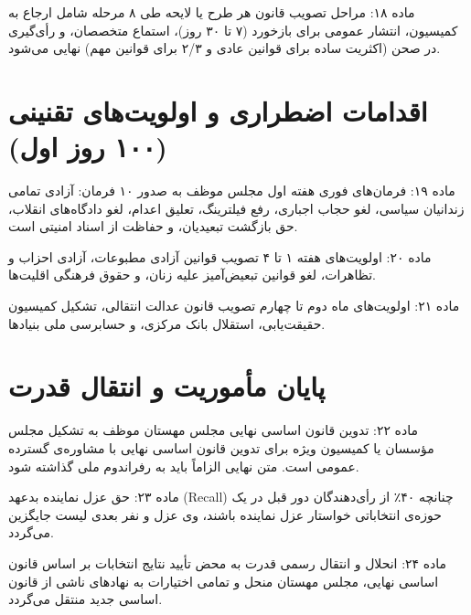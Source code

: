 \documentclass[12pt,a4paper,oneside]{report}
\begin{document}
\begin{articlebox}{ماده ۱۸: مراحل تصویب قانون}
هر طرح یا لایحه طی ۸ مرحله شامل ارجاع به کمیسیون، انتشار عمومی برای بازخورد (۷ تا ۳۰ روز)، استماع متخصصان، و رأی‌گیری در صحن (اکثریت ساده برای قوانین عادی و ۲/۳ برای قوانین مهم) نهایی می‌شود.
\end{articlebox}

\chapter{اقدامات اضطراری و اولویت‌های تقنینی (۱۰۰ روز اول)}

\begin{articlebox}{ماده ۱۹: فرمان‌های فوری هفته اول}
مجلس موظف به صدور ۱۰ فرمان: آزادی تمامی زندانیان سیاسی، لغو حجاب اجباری، رفع فیلترینگ، تعلیق اعدام، لغو دادگاه‌های انقلاب، حق بازگشت تبعیدیان، و حفاظت از اسناد امنیتی است.
\end{articlebox}

\begin{articlebox}{ماده ۲۰: اولویت‌های هفته ۱ تا ۴}
تصویب قوانین آزادی مطبوعات، آزادی احزاب و تظاهرات، لغو قوانین تبعیض‌آمیز علیه زنان، و حقوق فرهنگی اقلیت‌ها.
\end{articlebox}

\begin{articlebox}{ماده ۲۱: اولویت‌های ماه دوم تا چهارم}
تصویب قانون عدالت انتقالی، تشکیل کمیسیون حقیقت‌یابی، استقلال بانک مرکزی، و حسابرسی ملی بنیادها.
\end{articlebox}

\chapter{پایان مأموریت و انتقال قدرت}

\begin{articlebox}{ماده ۲۲: تدوین قانون اساسی نهایی}
مجلس مهستان موظف به تشکیل مجلس مؤسسان یا کمیسیون ویژه برای تدوین قانون اساسی نهایی با مشاوره‌ی گسترده عمومی است. متن نهایی الزاماً باید به رفراندوم ملی گذاشته شود.
\end{articlebox}

\begin{articlebox}{ماده ۲۳: حق عزل نماینده بدعهد (Recall)}
چنانچه ۴۰٪ از رأی‌دهندگان دور قبل در یک حوزه‌ی انتخاباتی خواستار عزل نماینده باشند، وی عزل و نفر بعدی لیست جایگزین می‌گردد.
\end{articlebox}

\begin{articlebox}{ماده ۲۴: انحلال و انتقال رسمی قدرت}
به محض تأیید نتایج انتخابات بر اساس قانون اساسی نهایی، مجلس مهستان منحل و تمامی اختیارات به نهادهای ناشی از قانون اساسی جدید منتقل می‌گردد.
\end{articlebox}
\end{document}
